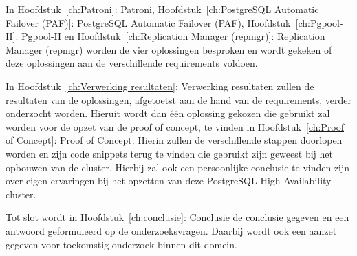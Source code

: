 In Hoofdstuk~\ref{ch:Patroni}: Patroni, Hoofdstuk~\ref{ch:PostgreSQL Automatic Failover (PAF)}: PostgreSQL Automatic Failover (PAF), Hoofdstuk~\ref{ch:Pgpool-II}: Pgpool-II en Hoofdstuk~\ref{ch:Replication Manager (repmgr)}: Replication Manager (repmgr) worden de vier oplossingen besproken en wordt gekeken of deze oplossingen aan de verschillende requirements voldoen.

In Hoofdstuk~\ref{ch:Verwerking resultaten}: Verwerking resultaten zullen de resultaten van de oplossingen, afgetoetst aan de hand van de requirements, verder onderzocht worden. Hieruit wordt dan één oplossing gekozen die gebruikt zal worden voor de opzet van de proof of concept, te vinden in Hoofdstuk~\ref{ch:Proof of Concept}: Proof of Concept. Hierin zullen de verschillende stappen doorlopen worden en zijn code snippets terug te vinden die gebruikt zijn geweest bij het opbouwen van de cluster. Hierbij zal ook een persoonlijke conclusie te vinden zijn over eigen ervaringen bij het opzetten van deze PostgreSQL High Availability cluster.

Tot slot wordt in Hoofdstuk~\ref{ch:conclusie}: Conclusie de conclusie gegeven en een antwoord geformuleerd op de onderzoeksvragen. Daarbij wordt ook een aanzet gegeven voor toekomstig onderzoek binnen dit domein.

